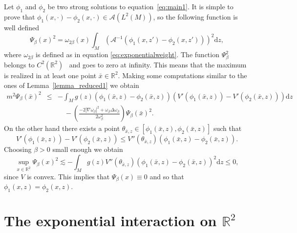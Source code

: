 \documentclass[a4paper,10pt]{article}
\newcommand{\mathd}{\mathrm{d}}
\begin{document}
Let $\phi_1$ and $\phi_2$ be two strong solutions to
equation~{\eqref{eq:main1}}. It is simple to prove that $\phi_1 (x, \cdot) -
\phi_2 (x, \cdot) \in \mathcal{A} (L^2 (M))$, so the following function is
well defined
\[ \Psi_{\beta} (x)^2 = \omega_{2 \beta} (x) \int_M (\mathcal{A}^{- 1} (\phi_1
   (x, z') - \phi_2 (x, z')))^2 \mathd z, \]
where $\omega_{2 \beta}$ is defined as in equation
{\eqref{eq:exponentialweight}}. The function $\Psi^2_{\beta}$ belongs to $C^2
(\mathbb{R}^2)$ \ and goes to zero at infinity. This means that the maximum is
realized in at least one point $\bar{x} \in \mathbb{R}^2 .$ Making some
computations similar to the ones of Lemma~\ref{lemma_reduced1} we obtain
\[ \begin{array}{lll}
     m^2 \Psi_{\beta} (\bar{x})^2 & \leqslant & - \int_M g (z) (\phi_1
     (\bar{x}, z) - \phi_2 (\bar{x}, z))(V' (\phi_1 (\bar{x}, z)) - V'
     (\phi_2 (\bar{x}, z))) \mathd z\\
     &  & \quad - \left( \frac{- 2 | \nabla \omega_{\beta} |^2 +
     \omega_{\beta} \Delta \omega_{\beta}}{2 \omega_{\beta}^2} \right)
     \Psi_{\beta} (\bar{x})^2 .
   \end{array} \]
On the other hand there exists a point $\theta_{\bar{x}, z} \in [\phi_1
(\bar{x}, z), \phi_2 (\bar{x}, z)]$ such that
\[ V' (\phi_1 (\bar{x}, z)) - V' (\phi_2 (\bar{x}, z)) \leqslant V''
   (\theta_{\bar{x}, z}) (\phi_1 (\bar{x}, z) - \phi_2 (\bar{x}, z)) . \]
Choosing $\beta > 0$ small enough we obtain
\[ \sup_{x \in \mathbb{R}^2} \Psi_{\beta} (x)^2 \lesssim - \int_M g (z) V''
   (\theta_{\bar{x}, z}) (\phi_1 (\bar{x}, z) - \phi_2 (\bar{x}, z))^2
   \mathd z \leqslant 0, \]
since $V$ is convex. This implies that $\Psi_{\beta} (x) \equiv 0$ and so that
$\phi_1 (x, z) = \phi_2 (x, z)$.

\section{The exponential interaction on
$\mathbb{R}^2$}\label{section_exponential}
\end{document}
